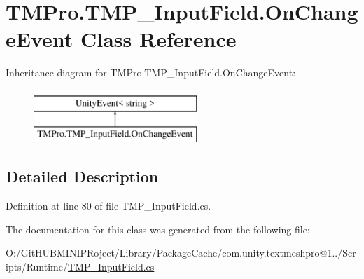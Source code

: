 \hypertarget{class_t_m_pro_1_1_t_m_p___input_field_1_1_on_change_event}{}\section{T\+M\+Pro.\+T\+M\+P\+\_\+\+Input\+Field.\+On\+Change\+Event Class Reference}
\label{class_t_m_pro_1_1_t_m_p___input_field_1_1_on_change_event}
Inheritance diagram for T\+M\+Pro.\+T\+M\+P\+\_\+\+Input\+Field.\+On\+Change\+Event\+:\begin{figure}[H]
\begin{center}
\leavevmode
\includegraphics[height=2.000000cm]{class_t_m_pro_1_1_t_m_p___input_field_1_1_on_change_event}
\end{center}
\end{figure}


\subsection{Detailed Description}


Definition at line 80 of file T\+M\+P\+\_\+\+Input\+Field.\+cs.



The documentation for this class was generated from the following file\+:\begin{DoxyCompactItemize}
\item 
O\+:/\+Git\+H\+U\+B\+M\+I\+N\+I\+P\+Roject/\+Library/\+Package\+Cache/com.\+unity.\+textmeshpro@1../\+Scripts/\+Runtime/\mbox{\hyperlink{_t_m_p___input_field_8cs}{T\+M\+P\+\_\+\+Input\+Field.\+cs}}\end{DoxyCompactItemize}
